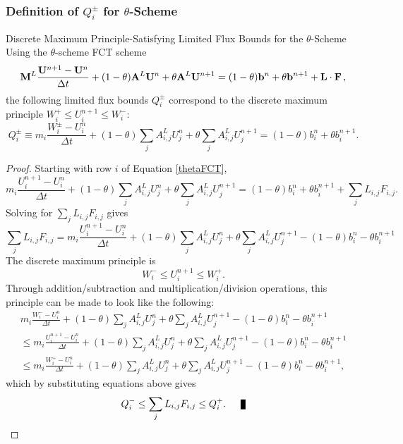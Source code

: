 \subsubsection{Definition of $Q_i^\pm$ for $\theta$-Scheme}
\begin{theorem}{Discrete Maximum Principle-Satisfying Limited Flux Bounds for
  the $\theta$-Scheme}
  Using the $\theta$-scheme FCT scheme
  \begin{equation}\label{thetaFCT}
    \mathbf{M}^L\frac{\mathbf{U}^{n+1}-\mathbf{U}^n}{\Delta t}
    + (1-\theta)\mathbf{A}^L\mathbf{U}^n + \theta\mathbf{A}^L\mathbf{U}^{n+1}
    = (1-\theta)\mathbf{b}^n + \theta\mathbf{b}^{n+1}
    + \mathbf{L}\cdot\mathbf{F} \,,
  \end{equation}
  the following limited flux bounds $Q_i^\pm$ correspond to the discrete
   maximum principle $W_i^+\le U_i^{n+1}\le W_i^-$:
   \begin{equation}
      Q_i^\pm \equiv m_i\frac{W_i^\pm - U_i^n}{\Delta t}
      +(1-\theta)\sum\limits_j A_{i,j}^L U_j^n
      +\theta\sum\limits_j A_{i,j}^L U_j^{n+1}
      =(1-\theta)b_i^n
      +\theta b_i^{n+1}.
   \end{equation}
\end{theorem}

\begin{proof}
  Starting with row $i$ of Equation \eqref{thetaFCT},
   \[
      m_i\frac{U_i^{n+1}-U_i^n}{\Delta t}
      + (1-\theta)\sum\limits_j A_{i,j}^L U_j^n
      + \theta\sum\limits_j A_{i,j}^L U_j^{n+1}
      = (1-\theta)b_i^n
      + \theta b_i^{n+1}
      + \sum\limits_j L_{i,j}F_{i,j}.
   \]
   Solving for $\sum\limits_j L_{i,j}F_{i,j}$ gives
   \[
      \sum\limits_j L_{i,j}F_{i,j} =
      m_i\frac{U_i^{n+1}-U_i^n}{\Delta t}
      + (1-\theta)\sum\limits_j A_{i,j}^L U_j^n
      + \theta\sum\limits_j A_{i,j}^L U_j^{n+1}
      - (1-\theta)b_i^n
      - \theta b_i^{n+1}
   \]
   The discrete maximum principle is
   \[
      W_i^-\le U_i^{n+1}\le W_i^+.
   \]
   Through addition/subtraction and multiplication/division operations, this
   principle can be made to look like the following:
   \begin{multline*}
   m_i\frac{W_i^--U_i^n}{\Delta t}
      + (1-\theta)\sum\limits_j A_{i,j}^L U_j^n
      + \theta\sum\limits_j A_{i,j}^L U_j^{n+1}
      - (1-\theta)b_i^n
      - \theta b_i^{n+1}\\
   \le m_i\frac{U_i^{n+1}-U_i^n}{\Delta t}
      + (1-\theta)\sum\limits_j A_{i,j}^L U_j^n
      + \theta\sum\limits_j A_{i,j}^L U_j^{n+1}
      - (1-\theta)b_i^n
      - \theta b_i^{n+1}\\
   \le m_i\frac{W_i^+-U_i^n}{\Delta t}
      + (1-\theta)\sum\limits_j A_{i,j}^L U_j^n
      + \theta\sum\limits_j A_{i,j}^L U_j^{n+1}
      - (1-\theta)b_i^n
      - \theta b_i^{n+1},
   \end{multline*}
   which by substituting equations above gives
   \[
      Q_i^-\le\sum\limits_j L_{i,j}F_{i,j}\le Q_i^+.\qed
   \]
\end{proof}
